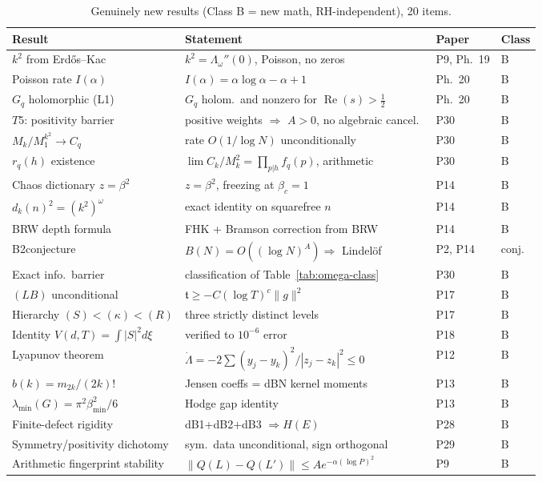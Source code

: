 \documentclass[11pt]{amsart}
\theoremstyle{definition}
\theoremstyle{remark}
\renewcommand{\Re}{\operatorname{Re}}
\newcommand{\half}{\tfrac{1}{2}}
\newcommand{\om}{\omega}
\newcommand{\kap}{\kappa}
\newcommand{\Lam}{\Lambda}
\begin{document}
\begin{table}[h]
\renewcommand{\arraystretch}{1.4}
\centering
\begin{tabular}{llll}
\toprule
Result & Statement & Paper & Class \\
\midrule
$k^2$ from Erd\H{o}s--Kac & $k^2=\Lambda_\om''(0)$, Poisson, no zeros & P9, Ph.~19 & B \\
Poisson rate $I(\alpha)$ & $I(\alpha)=\alpha\log\alpha-\alpha+1$ & Ph.~20 & B \\
$G_q$ holomorphic (L1) & $G_q$ holom.\ and nonzero for $\Re(s)>\half$ & Ph.~20 & B \\
$T5$: positivity barrier & positive weights $\Rightarrow$ $A>0$, no algebraic cancel.\ & P30 & B \\
$M_k/M_1^{k^2}\to C_q$ & rate $O(1/\log N)$ unconditionally & P30 & B \\
$r_q(h)$ existence & $\lim C_k/M_k^2 = \prod_{p|h}f_q(p)$, arithmetic & P30 & B \\
Chaos dictionary $z=\beta^2$ & $z = \beta^2$, freezing at $\beta_c=1$ & P14 & B \\
$d_k(n)^2 = (k^2)^\om$ & exact identity on squarefree $n$ & P14 & B \\
BRW depth formula & FHK + Bramson correction from BRW & P14 & B \\
B2conjecture & $B(N) = O((\log N)^A) \Rightarrow$ Lindel\"of & P2, P14 & conj. \\
Exact info.\ barrier & classification of Table~\ref{tab:omega-class} & P30 & B \\
$(LB)$ unconditional & $\mathfrak{t}\ge -C(\log T)^c\|g\|^2$ & P17 & B \\
Hierarchy $(S)<(\kap)<(R)$ & three strictly distinct levels & P17 & B \\
Identity $V(d,T) = \int|S|^2d\xi$ & verified to $10^{-6}$ error & P18 & B \\
Lyapunov theorem & $\dot\Lam = -2\sum(y_j-y_k)^2/|z_j-z_k|^2\le 0$ & P12 & B \\
$b(k) = m_{2k}/(2k)!$ & Jensen coeffs = dBN kernel moments & P13 & B \\
$\lambda_{\min}(G) = \pi^2\beta_{\min}^2/6$ & Hodge gap identity & P13 & B \\
Finite-defect rigidity & dB1+dB2+dB3 $\Rightarrow H(E)$ & P28 & B \\
Symmetry/positivity dichotomy & sym.\ data unconditional, sign orthogonal & P29 & B \\
Arithmetic fingerprint stability & $\|Q(L)-Q(L')\|\le Ae^{-\alpha(\log P)^2}$ & P9 & B \\
\bottomrule
\end{tabular}
\caption{Genuinely new results (Class B = new math, RH-independent), 20 items.}
\label{tab:new-results}
\end{table}
\end{document}
